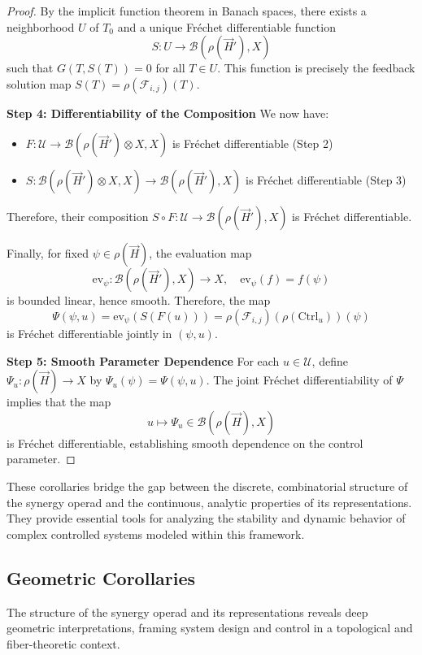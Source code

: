 \documentclass[11pt]{article}
\begin{document}
\begin{proof}
By the implicit function theorem in Banach spaces, there exists a neighborhood \(U\) of \(T_0\) and a unique Fr\'echet differentiable function
\[
S: U \to \mathcal{B}(\rho(\vec{H}'), X)
\]
such that \(G(T, S(T)) = 0\) for all \(T \in U\). This function is precisely the feedback solution map \(S(T) = \rho(\mathcal{F}_{i,j})(T)\).

\medskip
\noindent\textbf{Step 4: Differentiability of the Composition}
We now have:
\begin{itemize}
    \item \(F: \mathcal{U} \to \mathcal{B}(\rho(\vec{H}') \otimes X, X)\) is Fr\'echet differentiable (Step 2)
    \item \(S: \mathcal{B}(\rho(\vec{H}') \otimes X, X) \to \mathcal{B}(\rho(\vec{H}'), X)\) is Fr\'echet differentiable (Step 3)
\end{itemize}
Therefore, their composition \(S \circ F: \mathcal{U} \to \mathcal{B}(\rho(\vec{H}'), X)\) is Fr\'echet differentiable.

Finally, for fixed \(\psi \in \rho(\vec{H})\), the evaluation map
\[
\mathrm{ev}_\psi: \mathcal{B}(\rho(\vec{H}'), X) \to X, \quad \mathrm{ev}_\psi(f) = f(\psi)
\]
is bounded linear, hence smooth. Therefore, the map
\[
\Psi(\psi, u) = \mathrm{ev}_\psi(S(F(u))) = \rho(\mathcal{F}_{i,j})(\rho(\mathrm{Ctrl}_u))(\psi)
\]
is Fr\'echet differentiable jointly in \((\psi, u)\).

\medskip
\noindent\textbf{Step 5: Smooth Parameter Dependence}
For each \(u \in \mathcal{U}\), define \(\Psi_u: \rho(\vec{H}) \to X\) by \(\Psi_u(\psi) = \Psi(\psi, u)\). The joint Fr\'echet differentiability of \(\Psi\) implies that the map
\[
u \mapsto \Psi_u \in \mathcal{B}(\rho(\vec{H}), X)
\]
is Fr\'echet differentiable, establishing smooth dependence on the control parameter.
\end{proof}



These corollaries bridge the gap between the discrete, combinatorial structure of the synergy operad and the continuous, analytic properties of its representations. They provide essential tools for analyzing the stability and dynamic behavior of complex controlled systems modeled within this framework.

\subsection{Geometric Corollaries}\label{sec:Geometric Corollaries} 

The structure of the synergy operad and its representations reveals deep geometric interpretations, framing system design and control in a topological and fiber-theoretic context.
\end{document}
